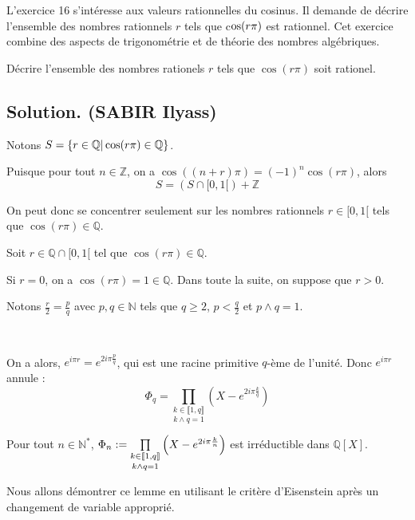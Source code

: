 L'exercice 16 s'int{\'e}resse aux valeurs rationnelles du cosinus. Il demande
de d{\'e}crire l'ensemble des nombres rationnels $r$ tels que c$\operatorname{os} (r
\pi)$ est rationnel. Cet exercice combine des aspects de trigonom{\'e}trie et
de th{\'e}orie des nombres alg{\'e}briques.

\begin{exercise}
D{\'e}crire l'ensemble des nombres rationels $r$ tels que $\cos (r \pi)$ soit
rationel.
\end{exercise}

\subsection*{Solution. (SABIR Ilyass)}

Notons $S = \{ r \in \mathbb{Q} |  \cos (r \pi) \in \mathbb{Q} \}$.

Puisque pour tout $n \in \mathbb{Z}$, on a $\cos ((n + r) \pi) = (- 1)^n \cos
(r \pi)$, alors
\[ S = (S \cap [0, 1 [) +\mathbb{Z} \]


On peut donc se concentrer seulement sur les nombres rationnels $r \in [0, 1
[$ tels que $\cos (r \pi) \in \mathbb{Q}$.

Soit $r \in \mathbb{Q} \cap [0, 1 [$ tel que $\cos (r \pi) \in \mathbb{Q}$.

Si $r = 0$, on a $\cos (r \pi) = 1 \in \mathbb{Q}$. Dans toute la suite, on
suppose que $r > 0$.

Notons $\frac{r}{2} = \frac{p}{q}$ avec $p, q \in \mathbb{N}$ tels que $q
\geqslant 2$, $p < \frac{q}{2}$ et $p \wedge q = 1$.

\

On a alors, $e^{i \pi r} = e^{2 i \pi \frac{p}{q}}$, qui est une racine
primitive $q$-{\`e}me de l'unit{\'e}. Donc $e^{i \pi r}$ annule :
\[ \Phi_q = \underset{k \wedge q = 1}{\underset{k \in \llbracket 1, q
   \rrbracket}{\prod}} \left( X - e^{2 i \pi \frac{k}{q}} \right) \]



Pour tout $n \in \mathbb{N}^{\ast}$, $\Phi_n := \underset{k \wedge q =
1}{\underset{k \in \llbracket 1, q \rrbracket}{\prod}} \left( X - e^{2 i \pi
\frac{k}{n}} \right)$ est irr{\'e}ductible dans $\mathbb{Q} [X]$.


Nous allons d{\'e}montrer ce lemme en utilisant le crit{\`e}re d'Eisenstein
apr{\`e}s un changement de variable appropri{\'e}.

